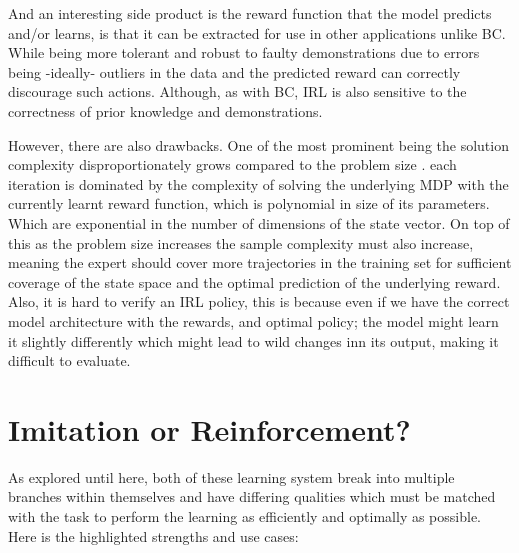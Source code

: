 And an interesting side product is the reward function that the model predicts and/or learns, is that it can be extracted for use in other applications unlike BC. While being more tolerant and robust to faulty demonstrations due to errors being -ideally- outliers in the data and the predicted reward can correctly discourage such actions. Although, as with BC, IRL is also sensitive to the correctness of prior knowledge and demonstrations.

However, there are also drawbacks. One of the most prominent being the solution complexity disproportionately grows compared to the problem size \cite{ARORA2021103500}. each iteration is dominated by the complexity of solving the underlying MDP with the currently learnt reward function, which is polynomial in size of its parameters. Which are exponential in the number of dimensions of the state vector. On top of this as the problem size increases the sample complexity must also increase, meaning the expert should cover more trajectories in the training set for sufficient coverage of the state space and the optimal prediction of the underlying reward. Also, it is hard to verify an IRL policy, this is because even if we have the correct model architecture with the rewards, and optimal policy; the model might learn it slightly differently which might lead to wild changes inn its output, making it difficult to evaluate.




\section{Imitation or Reinforcement?}
As explored until here, both of these learning system break into multiple branches within themselves and have differing qualities which must be matched with the task to perform the learning as efficiently and optimally as possible. Here is the highlighted strengths and use cases:



